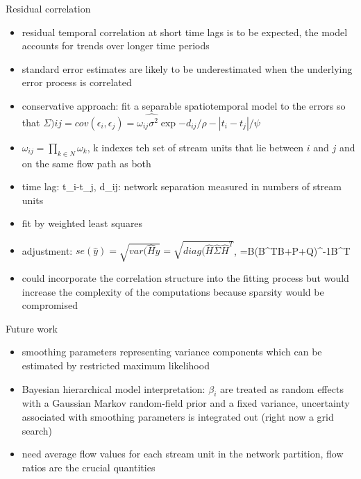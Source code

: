 \documentclass[12pt]{amsart}
\begin{document}
Residual correlation
\begin{itemize}
\item residual temporal correlation at short time lags is to be expected, the model accounts for trends over longer time periods
\item standard error estimates are likely to be underestimated when the underlying error process is correlated
\item conservative approach: fit a separable spatiotemporal model to the errors so that $\hat{\Sigma){ij}=cov(\epsilon_i,\epsilon_j)=\omega_{ij}\sigma^2 \exp{-d_{ij}/\rho-|t_i-t_j|/\psi}}$
\item $\omega_{ij}=\prod_{k\in N} \omega_k$, k indexes teh set of stream units that lie between $i$ and $j$ and on the same flow path as both
\item time lag: t_i-t_j, d_{ij}: network separation measured in numbers of stream units
\item fit by weighted least squares
\item adjustment: $se(\hat{y})=\sqrt{var(\hat{H}y}=\sqrt{diag(\hat{H}\hat{\Sigma}\hat{H}^T}$, =B(B^TB+P+Q)^{-1}B^T
\item could incorporate the correlation structure into the fitting process but would increase the complexity of the computations because sparsity would be compromised
\end{itemize}

Future work
\begin{itemize}

\item smoothing parameters representing variance components which can be estimated by restricted maximum likelihood
\item Bayesian hierarchical model interpretation: $\beta_i$ are treated as random effects with a Gaussian Markov random-field prior and a fixed variance, uncertainty associated with smoothing parameters is integrated out (right now a grid search)
\item need average flow values for each stream unit in the network partition, flow ratios are the crucial quantities
\end{itemize}
\end{document}
